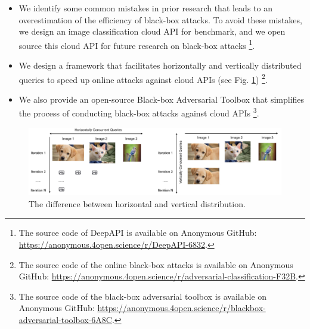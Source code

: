 \begin{itemize}
    \item We identify some common mistakes in prior research that leads to an overestimation of the efficiency of black-box attacks. To avoid these mistakes, we design an image classification cloud API for benchmark, and we open source this cloud API for future research on black-box attacks
    \footnote{The source code of DeepAPI is available on Anonymous GitHub: \url{https://anonymous.4open.science/r/DeepAPI-6832}.}.
    \item We design a framework that facilitates horizontally and vertically distributed queries to speed up online attacks against cloud APIs (see Fig. \ref{fig:distributability})
    \footnote{The source code of the online black-box attacks is available on Anonymous GitHub: \url{https://anonymous.4open.science/r/adversarial-classification-F32B}.}. 
    \item We also provide an open-source Black-box Adversarial Toolbox that simplifies the process of conducting black-box attacks against cloud APIs
    \footnote{The source code of the black-box adversarial toolbox is available on Anonymous GitHub: \url{https://anonymous.4open.science/r/blackbox-adversarial-toolbox-6A8C}.}. 
    
\end{itemize}

\begin{figure}[tbp]
    \centering
    \includegraphics[width=\linewidth]{figures/chapter_classification/distribution.jpg}
    \caption{The difference between horizontal and vertical distribution.}
    \label{fig:distributability}
\end{figure}

